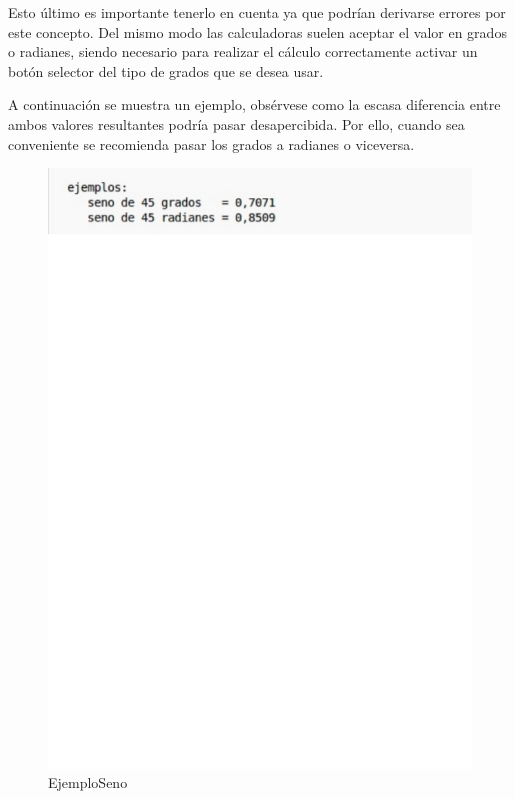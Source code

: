   Esto último es importante tenerlo en cuenta ya que podrían derivarse errores
por este concepto. Del mismo modo las calculadoras suelen aceptar el valor 
en grados o radianes, siendo necesario para realizar el cálculo correctamente
activar un botón selector del tipo de grados que se desea usar.

  A continuación se muestra un ejemplo, obsérvese como la escasa diferencia entre
ambos valores resultantes podría pasar desapercibida. Por ello, cuando sea conveniente
se recomienda pasar los grados a radianes o viceversa.
\begin{figure}[h]
\begin{center}
\includegraphics[scale=0.5]{images/ejemplo_seno.eps}
\end{center}
\caption{EjemploSeno}
\label{graph:5}
\end{figure}
